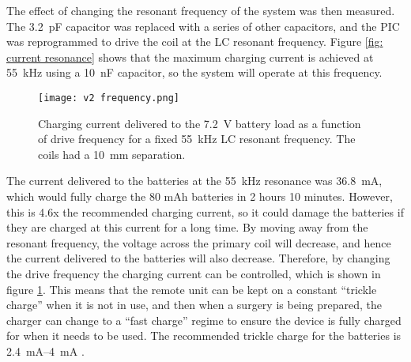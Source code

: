 The effect of changing the resonant frequency of the system was then measured. The \SI{3.2}{\pico\farad} capacitor was replaced with a series of other capacitors, and the PIC was reprogrammed to drive the coil at the LC resonant frequency. Figure \ref{fig: current resonance} shows that the maximum charging current is achieved at \SI{55}{\kilo\hertz} using a \SI{10}{\nano\farad} capacitor, so the system will operate at this frequency.\\ 


\begin{figure}[h!]
	\centering
	\texttt{[image: v2 frequency.png]}
	\caption{Charging current delivered to the \SI{7.2}{\volt} battery load as a function of drive frequency for a fixed \SI{55}{\kilo\hertz} LC resonant frequency. The coils had a \SI{10}{\milli\metre} separation.}
	\label{fig: current frequency}
\end{figure}

The current delivered to the batteries at the \SI{55}{\kilo\hertz} resonance was \SI{36.8}{\milli\ampere}, which would fully charge the 80 mAh batteries in 2 hours 10 minutes. However, this is 4.6x the recommended charging current, so it could damage the batteries if they are charged at this current for a long time. By moving away from the resonant frequency, the voltage across the primary coil will decrease, and hence the current delivered to the batteries will also decrease. Therefore, by changing the drive frequency the charging current can be controlled, which is shown in figure \ref{fig: current frequency}. This means that the remote unit can be kept on a constant ``trickle charge'' when it is not in use, and then when a surgery is being prepared, the charger can change to a ``fast charge'' regime to ensure the device is fully charged for when it needs to be used. The recommended trickle charge for the batteries is \SIrange{2.4}{4}{\milli\ampere} \cite{rs_pro_batteries}.\\

